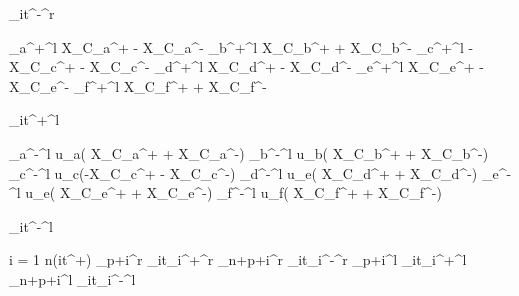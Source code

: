 \begin{program}
	_{\gls{it}^-}^r \gets {}		
	
	
	_{a^+}^l \gets  {}\gls{X}_{C_a^+} - \Im\gls{X}_{C_a^-}
	_{b^+}^l \gets  {}\gls{X}_{C_b^+} + \gls{X}_{C_b^-}
	_{c^+}^l \gets -\Im\gls{X}_{C_c^+} - \Im\gls{X}_{C_c^-}
	_{d^+}^l \gets  {}\gls{X}_{C_d^+} - \gls{X}_{C_d^-}
	_{e^+}^l \gets  {}\Im\gls{X}_{C_e^+} - \Im\gls{X}_{C_e^-}
	_{f^+}^l \gets  {}\gls{X}_{C_f^+} + \Im\gls{X}_{C_f^-}

	_{\gls{it}^+}^l \gets {}

    _{a^-}^l \gets   u_a(  \gls{X}_{C_a^+} + \Im\gls{X}_{C_a^-})
	_{b^-}^l \gets u_b(    \gls{X}_{C_b^+} + \gls{X}_{C_b^-})
	_{c^-}^l \gets u_c(-\Im\gls{X}_{C_c^+} - \Im\gls{X}_{C_c^-})
	_{d^-}^l \gets u_e(    \gls{X}_{C_d^+} + \gls{X}_{C_d^-})
	_{e^-}^l \gets u_e( \Im\gls{X}_{C_e^+} + \Im\gls{X}_{C_e^-})
	_{f^-}^l \gets u_f(    \gls{X}_{C_f^+} + \Im\gls{X}_{C_f^-})
		
	_{\gls{it}^-}^l \gets {}
	
	\FOR i = 1 \TO n(\gls{it}^+) \DO
		_{p+i}^r \gets {}_{\gls{it}_i^+}^r
		_{n+p+i}^r \gets {}_{\gls{it}_i^-}^r
		_{p+i}^l \gets {}_{\gls{it}_i^+}^l
		_{n+p+i}^l \gets {}_{\gls{it}_i^-}^l	
	\OD
\END
\end{program}
